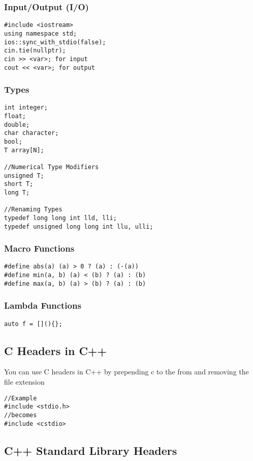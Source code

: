 \subsubsection{Input/Output (I/O)}
\begin{lstlisting}[style=CStyle]
#include <iostream>
using namespace std;
ios::sync_with_stdio(false);
cin.tie(nullptr);
cin >> <var>; for input
cout << <var>; for output
\end{lstlisting}

\subsubsection{Types}
\begin{lstlisting}[style=CStyle]
int integer;
float;
double;
char character;
bool;
T array[N];

//Numerical Type Modifiers
unsigned T;
short T;
long T;

//Renaming Types
typedef long long int lld, lli;
typedef unsigned long long int llu, ulli;
\end{lstlisting}

\subsubsection{Macro Functions}
\begin{lstlisting}[style=CStyle]
#define abs(a) (a) > 0 ? (a) : (-(a))
#define min(a, b) (a) < (b) ? (a) : (b)
#define max(a, b) (a) > (b) ? (a) : (b)
\end{lstlisting}

\subsubsection{Lambda Functions}
\begin{lstlisting}[style=CStyle]
auto f = [](){};
\end{lstlisting}

\subsection{C Headers in C++}
You can use C headers in C++ by prepending c to the from and removing the file extension

\begin{lstlisting}[style=CStyle]
//Example
#include <stdio.h>
//becomes
#include <cstdio>
\end{lstlisting}


\subsection{C++ Standard Library Headers}

